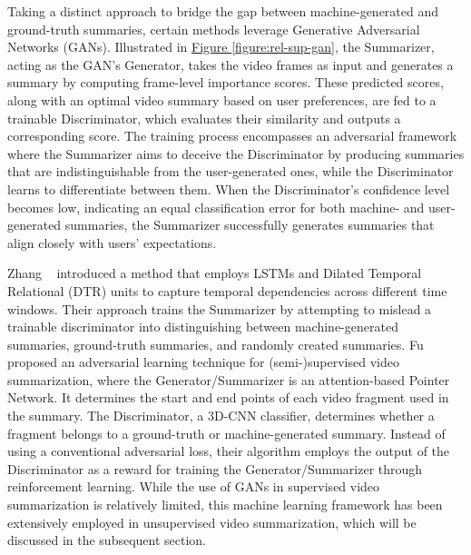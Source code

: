 		Taking a distinct approach to bridge the gap between machine-generated and ground-truth summaries, certain methods leverage Generative Adversarial Networks (GANs). Illustrated in \hyperref[figure:rel-sup-gan]{Figure \ref{figure:rel-sup-gan}}, the Summarizer, acting as the GAN's Generator, takes the video frames as input and generates a summary by computing frame-level importance scores. These predicted scores, along with an optimal video summary based on user preferences, are fed to a trainable Discriminator, which evaluates their similarity and outputs a corresponding score. The training process encompasses an adversarial framework where the Summarizer aims to deceive the Discriminator by producing summaries that are indistinguishable from the user-generated ones, while the Discriminator learns to differentiate between them. When the Discriminator's confidence level becomes low, indicating an equal classification error for both machine- and user-generated summaries, the Summarizer successfully generates summaries that align closely with users' expectations.
		
		Zhang \etal~\cite{zhang2019dtr} introduced a method that employs LSTMs and Dilated Temporal Relational (DTR) units to capture temporal dependencies across different time windows. Their approach trains the Summarizer by attempting to mislead a trainable discriminator into distinguishing between machine-generated summaries, ground-truth summaries, and randomly created summaries. Fu \etal~\cite{fu2019attentive} proposed an adversarial learning technique for (semi-)supervised video summarization, where the Generator/Summarizer is an attention-based Pointer Network. It determines the start and end points of each video fragment used in the summary. The Discriminator, a 3D-CNN classifier, determines whether a fragment belongs to a ground-truth or machine-generated summary. Instead of using a conventional adversarial loss, their algorithm employs the output of the Discriminator as a reward for training the Generator/Summarizer through reinforcement learning. While the use of GANs in supervised video summarization is relatively limited, this machine learning framework has been extensively employed in unsupervised video summarization, which will be discussed in the subsequent section.